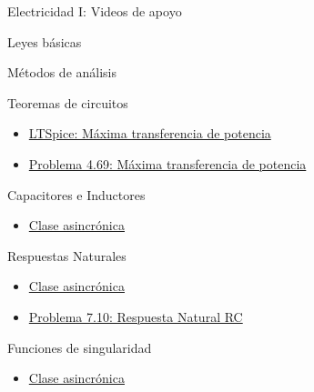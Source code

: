 \documentclass[12pt,letterpaper]{report}
\begin{document}
{\Huge Electricidad I: Videos de apoyo}

\vspace{1cm}

{\Large Leyes básicas}

\vspace{0.5cm}

{\Large Métodos de análisis}

\vspace{0.5cm}

{\Large Teoremas de circuitos}
\begin{itemize}
    \item \href{https://youtu.be/LQFKj_J37cA}{LTSpice: Máxima transferencia de potencia}
    \item \href{https://youtu.be/kjDn_0aK00A}{Problema 4.69: Máxima transferencia de potencia}
\end{itemize}

{\Large Capacitores e Inductores}
\begin{itemize}
    \item \href{https://youtu.be/Icl9_5sV-6E}{Clase asincrónica}
\end{itemize}

{\Large Respuestas Naturales}
\begin{itemize}
    \item \href{https://youtu.be/bWRGyjY0niY}{Clase asincrónica}
    \item \href{https://youtu.be/37KDKfhaRO8}{Problema 7.10: Respuesta Natural RC}
\end{itemize}

{\Large Funciones de singularidad}
\begin{itemize}
    \item \href{https://youtu.be/-DqJL51fJ6w}{Clase asincrónica}
\end{itemize}
\end{document}
